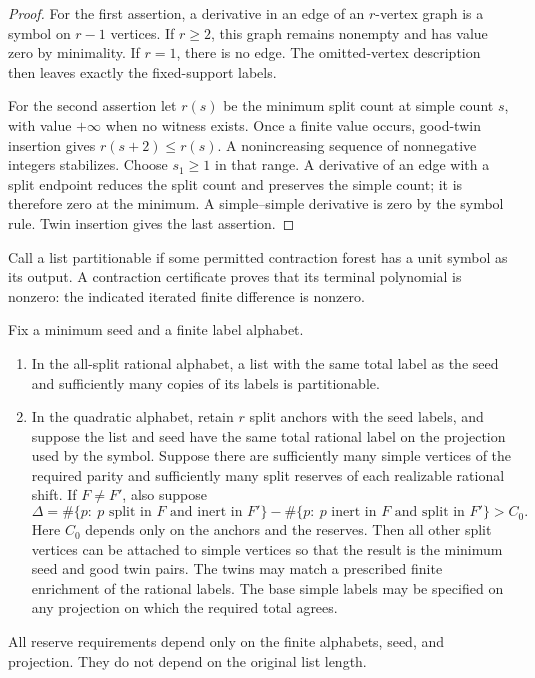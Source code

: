 \begin{proof}
For the first assertion, a derivative in an edge of an $r$-vertex graph is a
symbol on $r-1$ vertices.  If $r\ge2$, this graph remains nonempty and has
value zero by minimality.  If $r=1$, there is no edge.  The omitted-vertex
description then leaves exactly the fixed-support labels.

For the second assertion let $r(s)$ be the minimum split count at simple
count $s$, with value $+\infty$ when no witness exists.  Once a finite value
occurs, good-twin insertion gives $r(s+2)\le r(s)$.  A nonincreasing sequence
of nonnegative integers stabilizes.  Choose $s_1\ge1$ in that range.  A
derivative of an edge with a split endpoint reduces the split count and
preserves the simple count; it is therefore zero at the minimum.  A
simple--simple derivative is zero by the symbol rule.  Twin insertion gives
the last assertion.
\end{proof}

Call a list partitionable if some permitted contraction forest has a unit
symbol as its output.  A contraction certificate proves that its terminal
polynomial is nonzero: the indicated iterated finite difference is nonzero.

\begin{lemma}\label{pw:reserves}
Fix a minimum seed and a finite label alphabet.
\begin{enumerate}
\item In the all-split rational alphabet, a list with the same total label
as the seed and sufficiently many copies of its labels is partitionable.
\item In the quadratic alphabet, retain $r$ split anchors with the seed
labels, and suppose the list and seed have the same total rational label
on the projection used by the symbol.  Suppose there are sufficiently
many simple vertices of the required parity and sufficiently many split
reserves of each realizable rational shift.  If $F\ne F'$, also suppose
\begin{equation}\label{pw:donor-balance}
 \Delta=\#\{p:\ p\text{ split in }F\text{ and inert in }F'\}
       -\#\{p:\ p\text{ inert in }F\text{ and split in }F'\}>C_0.
\end{equation}
Here $C_0$ depends only on the anchors and the reserves.  Then all other
split vertices can be attached to simple vertices so that the result is
the minimum seed and good twin pairs.  The twins may match a prescribed
finite enrichment of the rational labels.  The base simple labels may be
specified on any projection on which the required total agrees.
\end{enumerate}
All reserve requirements depend only on the finite alphabets, seed, and
projection.  They do not depend on the original list length.
\end{lemma}


